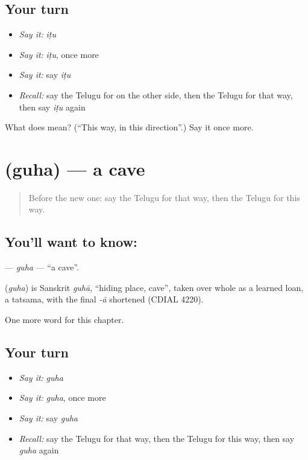 \subsection*{Your turn}
\begin{itemize}
\raggedright
  \item \emph{Say it:} \emph{iṭu}
  \item \emph{Say it:} \emph{iṭu}, once more
  \item \emph{Say it:} say \emph{iṭu}
  \item \emph{Recall:} say the Telugu for on the other side, then the Telugu for that way, then say \emph{iṭu} again
\end{itemize}

\begin{tcolorbox}[breakable,colback=teal!4,colframe=teal!35!black,title={Before you move on}]
What does  mean? (\textquotedblleft{}This way, in this direction\textquotedblright{}.) Say it once more.
\end{tcolorbox}
\section[\texorpdfstring{\te{గుహ} (guha)}{గుహ (guha)}]{ (guha) — a cave}

\label{lesson:TE-C174-guha}



\begin{quote}
Before the new one: say the Telugu for that way, then the Telugu for this way.
\end{quote}

\subsection*{You'll want to know: }
\textbf{} — \emph{guha} — \textquotedblleft{}a cave\textquotedblright{}.

\begin{cousinweb}
\textbf{} (\emph{guha}) is Sanskrit \emph{guhā}, \textquotedblleft{}hiding place, cave\textquotedblright{}, taken over whole as a learned loan, a tatsama, with the final \emph{-ā} shortened (CDIAL 4220).
\end{cousinweb}

\begin{grammarlens}[title={What you've built}]
One more word for this chapter.
\end{grammarlens}

\subsection*{Your turn}
\begin{itemize}
\raggedright
  \item \emph{Say it:} \emph{guha}
  \item \emph{Say it:} \emph{guha}, once more
  \item \emph{Say it:} say \emph{guha}
  \item \emph{Recall:} say the Telugu for that way, then the Telugu for this way, then say \emph{guha} again
\end{itemize}

